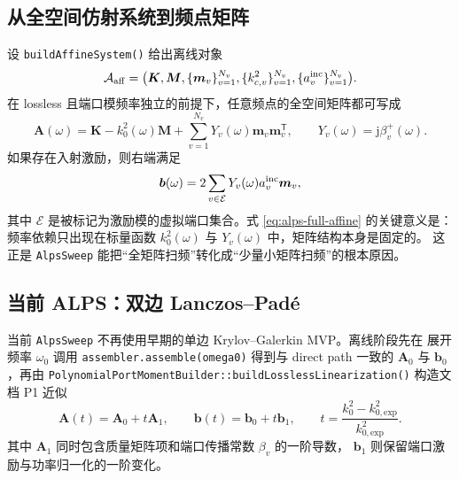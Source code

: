 \documentclass[UTF8,a4paper,11pt]{ctexart}
\newcommand{\jj}{\mathrm{j}}
\newcommand{\transpose}{\mathsf{T}}
\newcommand{\code}[1]{\texttt{\small #1}}
\begin{document}
\subsection{从全空间仿射系统到频点矩阵}

设 \code{buildAffineSystem()} 给出离线对象
\begin{equation}
    \mathcal{A}_{\mathrm{aff}}=\bigl(\bm K,\bm M,\{\bm m_v\}_{v=1}^{N_v},\{k_{c,v}^2\}_{v=1}^{N_v},\{a_v^{\rm inc}\}_{v=1}^{N_v}\bigr).
\end{equation}
在 lossless 且端口模频率独立的前提下，任意频点的全空间矩阵都可写成
\begin{equation}
    \bm A(\omega)=\bm K-k_0^2(\omega)\bm M+\sum_{v=1}^{N_v}Y_v(\omega)\bm m_v\bm m_v^{\transpose},
    \qquad Y_v(\omega)=\jj\beta_v^+(\omega).
    \label{eq:alps-full-affine}
\end{equation}
如果存在入射激励，则右端满足
\begin{equation}
    \bm b(\omega)=2\sum_{v\in\mathcal{E}}Y_v(\omega)a_v^{\rm inc}\bm m_v,
\end{equation}
其中 $\mathcal{E}$ 是被标记为激励模的虚拟端口集合。式 \eqref{eq:alps-full-affine} 的关键意义是：
频率依赖只出现在标量函数 $k_0^2(\omega)$ 与 $Y_v(\omega)$ 中，矩阵结构本身是固定的。
这正是 \code{AlpsSweep} 能把“全矩阵扫频”转化成“少量小矩阵扫频”的根本原因。

\subsection{当前 ALPS：双边 Lanczos--Padé}

当前 \code{AlpsSweep} 不再使用早期的单边 Krylov--Galerkin MVP。离线阶段先在
展开频率 $\omega_0$ 调用 \code{assembler.assemble(omega0)} 得到与 direct path 一致的
$\bm A_0$ 与 $\bm b_0$，再由
\code{PolynomialPortMomentBuilder::buildLosslessLinearization()} 构造文档 P1 近似
\begin{equation}
  \bm A(t)=\bm A_0+t\bm A_1,\qquad
  \bm b(t)=\bm b_0+t\bm b_1,\qquad
  t=\frac{k_0^2-k_{0,\mathrm{exp}}^2}{k_{0,\mathrm{exp}}^2}.
\end{equation}
其中 $\bm A_1$ 同时包含质量矩阵项和端口传播常数 $\beta_v$ 的一阶导数，
$\bm b_1$ 则保留端口激励与功率归一化的一阶变化。
\end{document}
